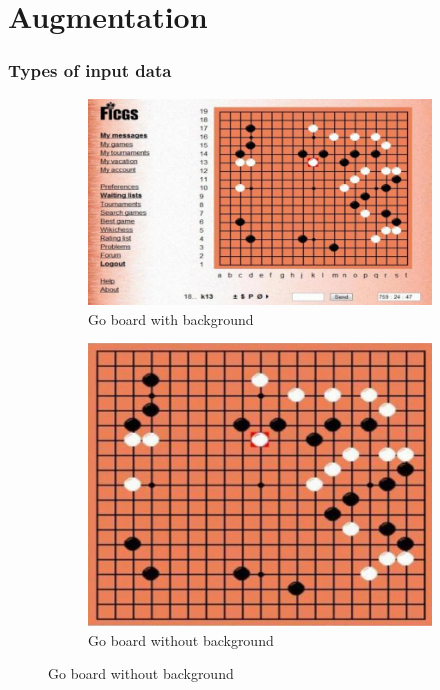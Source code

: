 \documentclass{beamer}
\begin{document}
\section{Augmentation}
\begin{frame}
\frametitle{Types of input data}


\begin{figure}
    \centering
    \begin{subfigure}[b]{0.5\textwidth}
        \includegraphics[width=\textwidth]{images/input_type1.png}
        \caption*{Go board with background}
    \end{subfigure}
    \begin{subfigure}[b]{0.365\textwidth}
        \includegraphics[width=\textwidth]{images/input_type2.png}
        \caption*{Go board without background}
    \end{subfigure}
\end{figure}
	

\end{frame}
\end{document}
